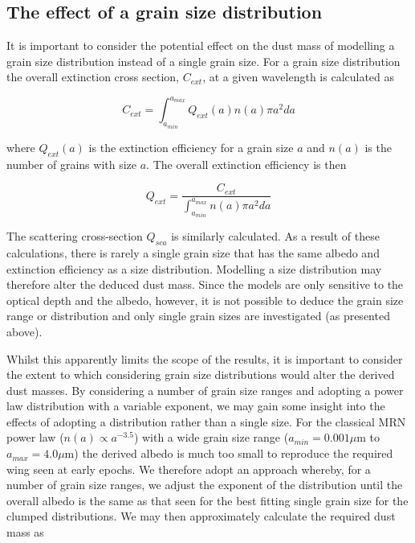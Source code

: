 
\subsection{The effect of a grain size distribution}
\label{gs_distn}
It is important to consider the potential effect on the dust mass of modelling a grain size distribution instead of a single grain size.  For a grain size distribution the overall extinction cross section, $C_{ext}$, at a given wavelength is calculated as

\[ C_{ext}=\int^{a_{max}}_{a_{min}} Q_{ext}(a) n(a) \pi a^2 da \]

where $Q_{ext}(a)$ is the extinction efficiency for a grain size $a$ and $n(a)$ is the number of grains with size $a$. The overall extinction efficiency is then

\[ Q_{ext} = \frac{C_{ext}}{ \int^{a_{max}}_{a_{min}} n(a) \pi a^2 da} \]
 
The scattering cross-section $Q_{sca}$ is similarly calculated.  As a result of these calculations, there is rarely a single grain size that has the same albedo and extinction efficiency as a size distribution.  Modelling a size distribution may therefore alter the deduced dust mass.  Since the models are only sensitive to the optical depth and the albedo, however, it is not possible to deduce the grain size range or distribution and only single grain sizes are investigated (as presented above).

Whilst this apparently limits the scope of the results, it is important to consider the extent to which considering grain size distributions would alter the derived dust masses.  By considering a number of grain size ranges and adopting a power law distribution with a variable exponent, we may gain some insight into the effects of adopting a distribution rather than a single size.  For the classical MRN power law ($n(a) \propto a^{-3.5}$) with a wide grain size range ($a_{min} = 0.001 \mu$m to $a_{max} = 4.0 \mu$m) the derived albedo is much too small to reproduce the required wing seen at early epochs.  We therefore adopt an approach whereby, for a number of grain size ranges, we adjust the exponent of the distribution until the overall albedo is the same as that seen for the best fitting single grain size for the clumped distributions.  We may then approximately calculate the required dust mass as


